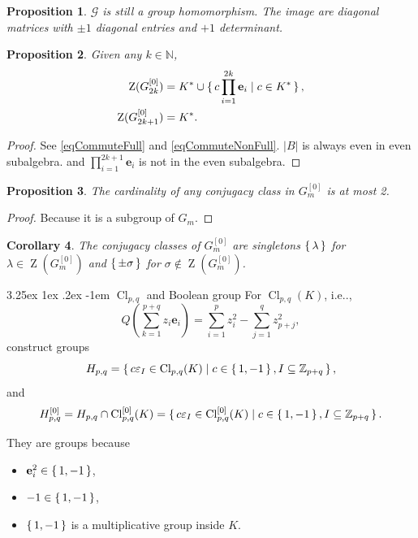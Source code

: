 \documentclass[12pt, letterpaper]{article}
\makeatletter
\newcommand{\nat}{\mathbb{N}}
\newcommand{\inte}{\mathbb{Z}}
\newcommand{\ZZ}{\operatorname{Z}}
\newcommand{\Cl}{\operatorname{Cl}}
\newcommand{\bfe}{\mathbf{e}}
\newcommand\ie{i.e\@ifnextchar.{}{.\@}}
\newcommand{\card}[1]{\left\lvert #1 \right\rvert}
\newtheorem{prop}{Proposition}[section]
\newtheorem{cor}[prop]{Corollary}
\renewcommand\paragraph{\@startsection{paragraph}{4}{\z@}%
	{3.25ex \@plus1ex \@minus.2ex}%
	{-1em}%
	{\normalfont\normalsize\bfseries}}
\theoremstyle{definition}
\theoremstyle{remark}
\theoremstyle{definition}
\theoremstyle{plain}
\numberwithin{equation}{section}
\makeatother
\begin{document}
	\begin{prop}\label{propEvenSubAlgToBool}
		$\mathcal{G}$ is still a group homomorphism. The image are diagonal matrices with $\pm1$ diagonal entries and $+1$ determinant.
	\end{prop}
	
	\begin{prop}\label{propCenterGm0}
		Given any $k\in \nat$,
		\[\begin{aligned}
			\ZZ(G_{2k}^{[0]})&=K^*\cup\set{c\prod_{i=1}^{2k}\bfe_i|c\in K^*},\\
			\ZZ(G_{2k+1}^{[0]})&=K^{*}.\\
		\end{aligned}\]
	\end{prop}
	\begin{proof}
		See \eqref{eqCommuteFull} and \eqref{eqCommuteNonFull}.
		$\card{B}$ is always even in even subalgebra.
		and $\prod_{i=1}^{2k+1}\bfe_i$ is not in the even subalgebra.
	\end{proof}
	\begin{prop}
		The cardinality of any conjugacy class in $G_m^{[0]}$ is at most 2.
	\end{prop}
	\begin{proof}
		Because it is a subgroup of $G_m$.
	\end{proof}
	\begin{cor}\label{corConjGm0}
		The conjugacy classes of $G_m^{[0]}$ are singletons $\set{\lambda}$ for $\lambda\in \ZZ(G_m^{[0]})$
		and $\set{\pm\sigma}$ for $\sigma\notin \ZZ(G_m^{[0]})$.
	\end{cor}
	
	\paragraph{$\Cl_{p,q}$ and Boolean group}
	For $\Cl_{p,q}(K)$, \ie, 
	\[Q\left(\sum_{k=1}^{p+q}z_i\bfe_i\right)=\sum_{i=1}^{p}z_i^2-\sum_{j=1}^{q}z_{p+j}^2,\]
	construct groups
	\[H_{p,q}=\set{c\varepsilon_I\in\Cl_{p,q}(K)|c\in\set{1,-1},I\subseteq \inte_{p+q}},\]
	and
	\[H^{[0]}_{p,q}=H_{p,q}\cap\Cl^{[0]}_{p,q}(K)=\set{c\varepsilon_I\in\Cl^{[0]}_{p,q}(K)|c\in\set{1,-1},I\subseteq \inte_{p+q}}.\]
	
	They are groups because
	\begin{itemize}
		\item $\bfe_i^2\in \set{1,-1}$,
		\item $-1 \in \set{1,-1}$,
		\item $\set{1,-1}$ is a multiplicative group inside $K$.
	\end{itemize}
\end{document}
